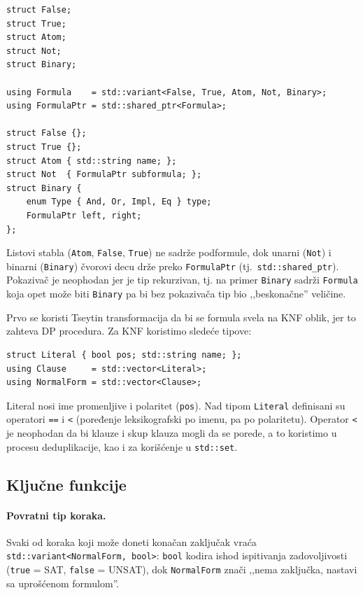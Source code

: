 \documentclass[a4paper,10pt]{article}
\begin{document}
\begin{lstlisting}
struct False;
struct True;
struct Atom;
struct Not;
struct Binary;

using Formula    = std::variant<False, True, Atom, Not, Binary>;
using FormulaPtr = std::shared_ptr<Formula>;

struct False {};
struct True {};
struct Atom { std::string name; };
struct Not  { FormulaPtr subformula; };
struct Binary {
    enum Type { And, Or, Impl, Eq } type;
    FormulaPtr left, right;
};
\end{lstlisting}

\noindent Listovi stabla (\verb|Atom|, \verb|False|, \verb|True|) ne
sadrže podformule, dok unarni (\verb|Not|) i binarni (\verb|Binary|)
čvorovi decu drže preko \verb|FormulaPtr| (tj.\ \verb|std::shared_ptr|).
Pokazivač je neophodan jer je tip rekurzivan, tj. na primer \verb|Binary| sadrži
\verb|Formula| koja opet može biti \verb|Binary| pa bi bez pokazivača tip bio ,,beskonačne'' veličine.

Prvo se koristi Tseytin transformacija da bi se formula svela na KNF
oblik, jer to zahteva DP procedura. Za KNF koristimo sledeće tipove:

\begin{lstlisting}
struct Literal { bool pos; std::string name; };
using Clause     = std::vector<Literal>;
using NormalForm = std::vector<Clause>;
\end{lstlisting}

Literal nosi ime promenljive i polaritet (\verb|pos|). Nad tipom \verb|Literal| definisani su operatori \verb|==| i \verb|<| (poređenje leksikografski po imenu, pa po polaritetu). Operator \verb|<| je neophodan da bi klauze i skup klauza mogli da se porede, a to koristimo u procesu deduplikacije, kao i za korišćenje u \verb|std::set|.

\subsection{Ključne funkcije}

\paragraph{Povratni tip koraka.} Svaki od koraka koji može doneti konačan zaključak vraća \verb|std::variant<NormalForm, bool>|: \verb|bool| kodira ishod ispitivanja zadovoljivosti (\verb|true| = SAT, \verb|false| = UNSAT), dok \verb|NormalForm| znači ,,nema zaključka, nastavi sa uprošćenom formulom''. 
\end{document}
